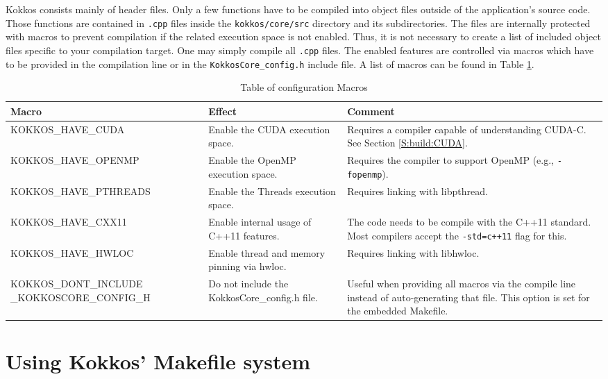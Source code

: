Kokkos consists mainly of header files. 
Only a few functions have to be compiled into object files outside of the application's source code.
Those functions are contained in \verb!.cpp! files inside the \lstinline|kokkos/core/src| directory and its subdirectories.
The files are internally protected with macros to prevent compilation if the related execution space is not enabled. 
Thus, it is not necessary to create a list of included object files specific to your compilation target.
One may simply compile all \verb!.cpp! files. 
The enabled features are controlled via macros which have to be provided in the compilation line or in the \lstinline|KokkosCore_config.h| include file. 
A list of macros can be found in Table \ref{TBL:CompileMacros}.
\begin{table}
\caption{Table of configuration Macros}
\label{TBL:CompileMacros}
\begin{small}
\begin{tabular}[t]{p{}p{}p{}}
\hline\hline
Macro & Effect & Comment \\
\hline
{\tiny KOKKOS\_HAVE\_CUDA} & Enable the CUDA execution space. & Requires a compiler capable of understanding CUDA-C. See Section \ref{S:build:CUDA}. \\
{\tiny KOKKOS\_HAVE\_OPENMP} & Enable the OpenMP execution space. & Requires the compiler to support OpenMP (e.g., \verb!-fopenmp!). \\
{\tiny KOKKOS\_HAVE\_PTHREADS} & Enable the Threads execution space. & Requires linking with libpthread.\\
{\tiny KOKKOS\_HAVE\_CXX11} & Enable internal usage of C++11 features. & The code needs to be compile with the C++11 standard. Most compilers accept the \verb!-std=c++11! flag for this.\\
{\tiny KOKKOS\_HAVE\_HWLOC} & Enable thread and memory pinning via hwloc. & Requires linking with libhwloc.\\
{\tiny KOKKOS\_DONT\_INCLUDE \_KOKKOSCORE\_CONFIG\_H} & Do not include the KokkosCore\_config.h file. & Useful when providing all macros via the compile line instead of auto-generating that file. 
This option is set for the embedded Makefile. \\
\hline\hline
\end{tabular}
\end{small}
\end{table}

\section{Using Kokkos' Makefile system}\label{S:build:make}

